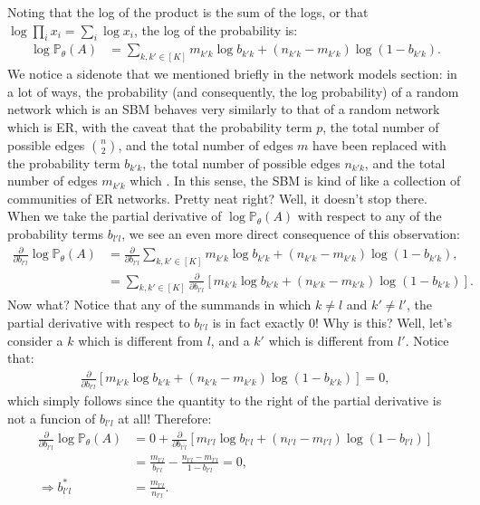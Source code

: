 \documentclass[letterpaper,10pt,english]{jupyterBook}
\begin{document}
\sphinxAtStartPar
Noting that the log of the product is the sum of the logs, or that \(\log \prod_i x_i = \sum_i \log x_i\), the log of the probability is:
\begin{align*}
    \log \mathbb P_\theta(A) &= \sum_{k, k' \in [K]} m_{k'k}\log b_{k'k} + \left(n_{k'k} - m_{k'k}\right)\log(1 - b_{k'k}).
\end{align*}
\sphinxAtStartPar
We notice a side\sphinxhyphen{}note that we mentioned briefly in the network models section: in a lot of ways, the probability (and consequently, the log probability) of a random network which is an  SBM behaves very similarly to that of a random network which is ER, with the caveat that the probability term \(p\), the total number of possible edges \(\binom n 2\), and the total number of edges \(m\) have been replaced with the probability term \(b_{k'k}\), the total number of possible edges \(n_{k'k}\), and the total number of edges \(m_{k'k}\) which . In this sense, the  SBM is kind of like a collection of communities of ER networks. Pretty neat right? Well, it doesn’t stop there. When we take the partial derivative of \(\log \mathbb P_\theta(A)\) with respect to any of the probability terms \(b_{l'l}\), we see an even more direct consequence of this observation:
\begin{align*}
    \frac{\partial }{\partial b_{l' l}}\log \mathbb P_\theta(A) &= \frac{\partial}{\partial b_{l'l}}\sum_{k, k' \in [K]} m_{k'k}\log b_{k'k} + \left(n_{k'k} - m_{k'k}\right)\log(1 - b_{k'k}), \\
    &= \sum_{k, k' \in [K]} \frac{\partial}{\partial b_{l'l}}\left[m_{k'k}\log b_{k'k} + \left(n_{k'k} - m_{k'k}\right)\log(1 - b_{k'k})\right].
\end{align*}
\sphinxAtStartPar
Now what? Notice that any of the summands in which \(k \neq l\) and \(k' \neq l'\), the partial derivative with respect to \(b_{l'l}\) is in fact exactly \(0\)! Why is this? Well, let’s consider a \(k\) which is different from \(l\), and a \(k'\) which is different from \(l'\). Notice that:
\begin{align*}
\frac{\partial}{\partial b_{l'l}}\left[m_{k'k}\log b_{k'k} + \left(n_{k'k} - m_{k'k}\right)\log(1 - b_{k'k})\right] = 0,
\end{align*}
\sphinxAtStartPar
which simply follows since the quantity to the right of the partial derivative is not a funcion of \(b_{l'l}\) at all! Therefore:
\begin{align*}
    \frac{\partial }{\partial b_{l' l}}\log \mathbb P_\theta(A) &= 0 + \frac{\partial}{\partial b_{l'l}}\left[m_{l'l}\log b_{l'l} + \left(n_{l'l} - m_{l'l}\right)\log(1 - b_{l'l})\right] \\
    &= \frac{m_{l'l}}{b_{l'l}} - \frac{n_{l'l} - m_{l'l}}{1 - b_{l'l}} = 0, \\
\Rightarrow b_{l'l}^* &= \frac{m_{l'l}}{n_{l'l}}.
\end{align*}
\end{document}
